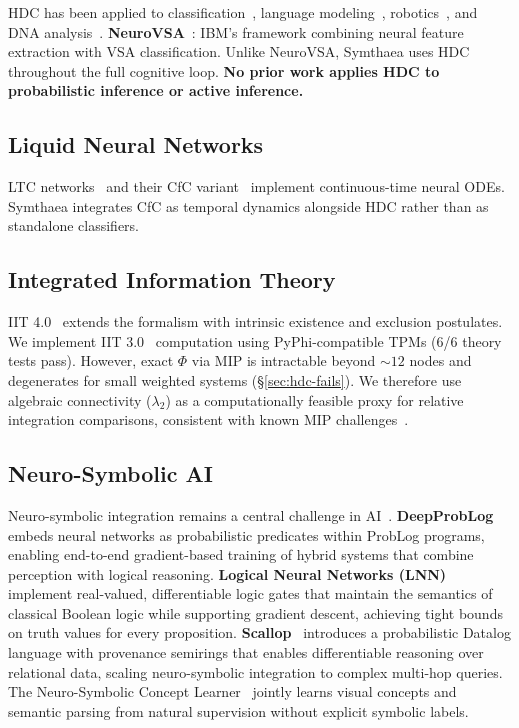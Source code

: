 \documentclass[10pt,letterpaper]{article}
\renewcommand{\Phi}{\varPhi}
\begin{document}
HDC has been applied to classification~\cite{rahimi2016robust,imani2019hierarchical}, language modeling~\cite{joshi2016language}, robotics~\cite{neubert2019introduction}, and DNA analysis~\cite{kim2020hdc}.
\textbf{NeuroVSA}~\cite{hersche2023neurovsa}: IBM's framework combining neural feature extraction with VSA classification. Unlike NeuroVSA, Symthaea uses HDC throughout the full cognitive loop.
\textbf{No prior work applies HDC to probabilistic inference or active inference.}

\subsection{Liquid Neural Networks}

LTC networks~\cite{hasani2021liquid} and their CfC variant~\cite{hasani2022closed} implement continuous-time neural ODEs. Symthaea integrates CfC as temporal dynamics alongside HDC rather than as standalone classifiers.

\subsection{Integrated Information Theory}

IIT 4.0~\cite{albantakis2023integrated} extends the formalism with intrinsic existence and exclusion postulates. We implement IIT 3.0~\cite{tononi2016integrated} computation using PyPhi-compatible TPMs (6/6 theory tests pass). However, exact $\Phi$ via MIP is intractable beyond ${\sim}12$ nodes and degenerates for small weighted systems (\S\ref{sec:hdc-fails}). We therefore use algebraic connectivity ($\lambda_2$) as a computationally feasible proxy for relative integration comparisons, consistent with known MIP challenges~\cite{toker2019information}.

\subsection{Neuro-Symbolic AI}

Neuro-symbolic integration remains a central challenge in AI~\cite{garcez2020neurosymbolic}.
\textbf{DeepProbLog}~\cite{manhaeve2018deepproblog} embeds neural networks as probabilistic predicates within ProbLog programs, enabling end-to-end gradient-based training of hybrid systems that combine perception with logical reasoning.
\textbf{Logical Neural Networks (LNN)}~\cite{riegel2020logical} implement real-valued, differentiable logic gates that maintain the semantics of classical Boolean logic while supporting gradient descent, achieving tight bounds on truth values for every proposition.
\textbf{Scallop}~\cite{li2023scallop} introduces a probabilistic Datalog language with provenance semirings that enables differentiable reasoning over relational data, scaling neuro-symbolic integration to complex multi-hop queries.
The Neuro-Symbolic Concept Learner~\cite{mao2019neuro} jointly learns visual concepts and semantic parsing from natural supervision without explicit symbolic labels.
\end{document}
